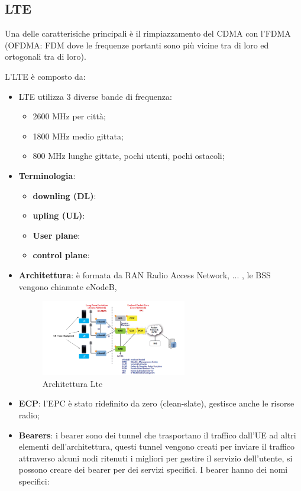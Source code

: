 \documentclass[12pt]{article}
\begin{document}
\subsection{LTE}
Una delle caratterisiche principali \`e il rimpiazzamento del CDMA con l'FDMA (OFDMA: FDM dove le frequenze portanti sono pi\`u vicine tra di loro ed ortogonali tra di loro).

L'LTE \`e composto da:
\begin{itemize}
    \item LTE utilizza 3 diverse bande di frequenza:
        \begin{itemize}
            \item 2600 MHz per citt\`a;
            \item 1800 MHz medio gittata;
            \item 800 MHz lunghe gittate, pochi utenti, pochi ostacoli;
        \end{itemize}
    \item \textbf{Terminologia}:
        \begin{itemize}
            \item \textbf{downling (DL)}: 
            \item \textbf{upling (UL)}:
            \item \textbf{User plane}:
            \item \textbf{control plane}:
        \end{itemize}
    \item \textbf{Architettura}: \`e formata da RAN Radio Access Network, ... ,  le BSS vengono chiamate eNodeB, 
        \begin{figure}[H]
            \centering
            \includegraphics[width=0.6\textwidth]{architettura-lte.png}
            \caption{Architettura Lte}
            \label{fig:architettura-lte}
        \end{figure}
    \item \textbf{ECP}: l'EPC \`e stato ridefinito da zero (clean-slate), gestisce anche le risorse radio;
    \item \textbf{Bearers}: i bearer sono dei tunnel che trasportano il traffico dall'UE ad altri elementi dell'architettura, questi tunnel vengono creati per inviare il traffico attraverso alcuni nodi ritenuti i migliori per gestire il servizio dell'utente, si possono creare dei bearer per dei servizi specifici. I bearer hanno dei nomi specifici:

\end{itemize}
\end{document}
